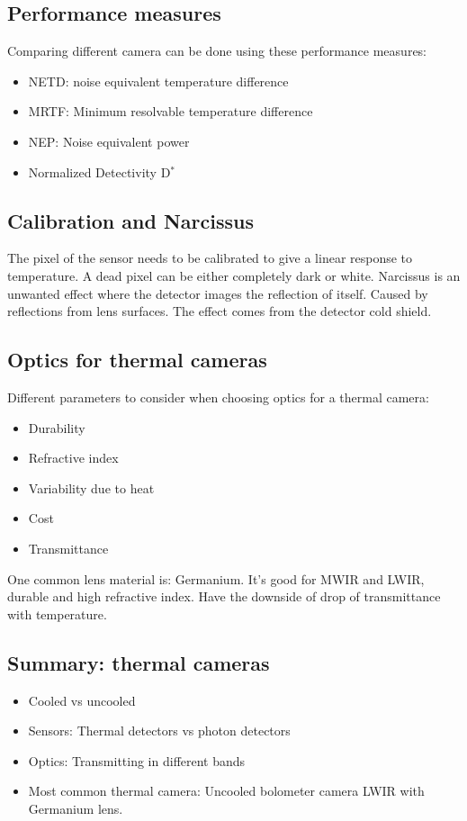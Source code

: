 	\subsection*{Performance measures}
	Comparing different camera can be done using these performance measures:
	\begin{itemize}
		\item NETD: noise equivalent temperature difference
		\item MRTF: Minimum resolvable temperature difference
		\item NEP: Noise equivalent power
		\item Normalized Detectivity D$^{*}$ 
	\end{itemize}

	\subsection*{Calibration and Narcissus}
	The pixel of the sensor needs to be calibrated to give a linear response to temperature. A dead pixel can be either completely dark or white. Narcissus is an unwanted effect where the detector images the reflection of itself. Caused by reflections from lens surfaces. The effect comes from the detector cold shield.

	\subsection*{Optics for thermal cameras}
	Different parameters to consider when choosing optics for a thermal camera:

	\begin{itemize}
		\item Durability
		\item Refractive index
		\item Variability due to heat
		\item Cost
		\item Transmittance
	\end{itemize}

	One common lens material is: Germanium. It's good for MWIR and LWIR, durable and high refractive index. Have the downside of drop of transmittance with temperature. 

	\subsection*{Summary: thermal cameras}
	\begin{itemize}
		\item Cooled vs uncooled
		\item Sensors: Thermal detectors vs photon detectors
		\item Optics: Transmitting in different bands
		\item Most common thermal camera: Uncooled bolometer camera LWIR with Germanium lens. 
	\end{itemize}
	

